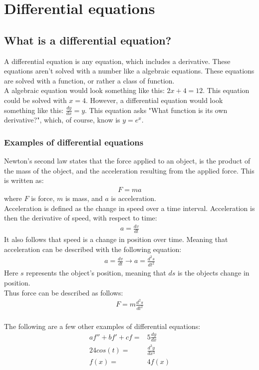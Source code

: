 \chapter{Differential equations}

\section{What is a differential equation?}
A differential equation is any equation, which includes a derivative. These equations aren't solved with a number like a algebraic equations. These equations are solved with a function, or rather a class of function. \\
A algebraic equation would look something like this: $2x+4=12$. This equation could be solved with $x=4$. However, a differential equation would look something like this: $\frac{dy}{dx} = y$. This equation asks "What function is its own derivative?", which, of course, know is $y=e^x$. \\

\subsection{Examples of differential equations}
Newton's second law states that the force applied to an object, is the product of the mass of the object, and the acceleration resulting from the applied force. This is written as: 
\begin{align*}
	F=ma
\end{align*}
where $F$ is force, $m$ is mass, and $a$ is acceleration. \\
Acceleration is defined as the change in speed over a time interval. Acceleration is then the derivative of speed, with respect to time:
\begin{align}
	a = \frac{dv}{dt}
\end{align}
It also follows that speed is a change in position over time. Meaning that acceleration can be described with the following equation:
\begin{align*}
	a = \frac{dv}{dt} \rightarrow a = \frac{d^2s}{dt^2}
\end{align*}
Here $s$ represents the object's position, meaning that $ds$ is the objects change in position. \\
Thus force can be described as follows:
\begin{align}
	 F = m\frac{d^2s}{dt^2}
\end{align}
\\
The following are a few other examples of differential equations:
\begin{align}
	af''+bf'+cf =& 5\frac{dy}{dx}		\\
	24cos(t)=&\frac{d^3y}{dx^3}			\\
	f(x)=&4f(x) 						
\end{align}

